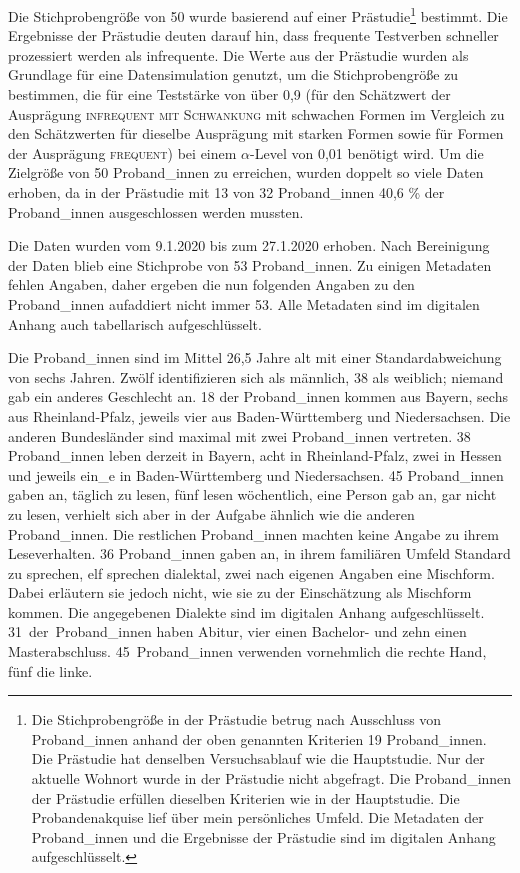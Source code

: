 \begin{sloppypar}
Die Stichprobengröße von 50 wurde basierend auf einer Prästudie\footnote{Die Stichprobengröße in der Prästudie betrug nach Ausschluss von Proband\_innen anhand der oben genannten Kriterien 19 Proband\_innen. Die Prästudie hat denselben Versuchsablauf wie die Hauptstudie. Nur der aktuelle Wohnort wurde in der Prästudie nicht abgefragt. Die Proband\_innen der Prästudie erfüllen dieselben Kriterien wie in der Hauptstudie. Die Probandenakquise lief über mein persönliches Umfeld. Die Metadaten der Proband\_innen und die Ergebnisse der Prästudie sind im digitalen Anhang aufgeschlüsselt.} bestimmt. Die Ergebnisse der Prästudie deuten darauf hin, dass frequente Testverben schneller prozessiert werden als infrequente. Die Werte aus der Prästudie wurden als Grundlage für eine Datensimulation genutzt, um die Stichprobengröße zu bestimmen, die für eine Teststärke von über 0,9 (für den Schätzwert der Ausprägung \textsc{infrequent mit Schwankung} mit schwachen Formen im Vergleich zu den Schätzwerten für dieselbe Ausprägung mit starken Formen sowie für Formen der Ausprägung \textsc{frequent}) bei einem $\alpha$-Level von 0,01 benötigt wird. Um die Zielgröße von 50 Proband\_innen zu erreichen, wurden doppelt so viele Daten erhoben, da in der Prästudie mit 13 von 32 Proband\_innen 40,6 \% der Pro\-\mbox{band\_in}\-nen ausgeschlossen werden mussten.
\end{sloppypar}

Die Daten wurden vom 9.1.2020 bis zum 27.1.2020 erhoben. Nach Bereinigung der Daten blieb eine Stichprobe von 53 Proband\_innen. Zu einigen Metadaten fehlen Angaben, daher ergeben die nun folgenden Angaben zu den Pro\-\mbox{band\_in}\-nen aufaddiert nicht immer 53. Alle Metadaten sind im digitalen Anhang auch tabellarisch aufgeschlüsselt. 


Die Proband\_innen sind im Mittel 26,5 Jahre alt mit einer Standardabweichung von sechs Jahren. Zwölf identifizieren sich als männlich, 38 als weiblich; niemand gab ein anderes Geschlecht an. 18 der Proband\_innen kommen aus Bayern, sechs aus Rheinland-Pfalz, jeweils vier aus Baden-Württemberg und Niedersachsen. Die anderen Bundesländer sind maximal mit zwei Proband\_innen vertreten. 38 Proband\_innen leben derzeit in Bayern, acht in Rheinland-Pfalz, zwei in Hessen und jeweils ein\_e in Baden-Württemberg und Niedersachsen. 45 Proband\_innen gaben an, täglich zu lesen, fünf lesen wöchentlich, eine Person gab an, gar nicht zu lesen, verhielt sich aber in der Aufgabe ähnlich wie die anderen Proband\_innen. Die restlichen Proband\_innen machten keine Angabe zu ihrem Leseverhalten. 36 Proband\_innen gaben an, in ihrem familiären Umfeld Standard zu sprechen, elf sprechen dialektal, zwei nach eigenen Angaben eine Mischform. Dabei erläutern sie jedoch nicht, wie sie zu der Einschätzung als Mischform kommen. Die angegebenen Dialekte sind im digitalen Anhang  aufgeschlüsselt. 31~der~Proband\_innen haben Abitur, vier einen Bachelor- und zehn einen Masterabschluss. 45~Proband\_innen verwenden vornehmlich die rechte Hand, fünf die linke. 


